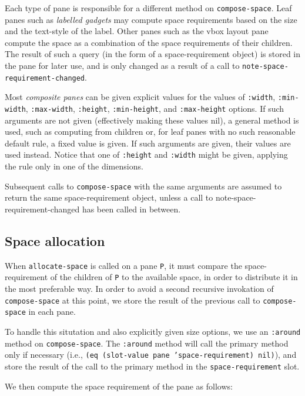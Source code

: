 Each type of pane is responsible for a different method on
\texttt{compose-space}.  Leaf panes such as \emph{labelled gadgets} may
compute space requirements based on the size and the text-style of the
label.  Other panes such as the vbox layout pane compute the space as a
combination of the space requirements of their children.  The result of
such a query (in the form of a space-requirement object) is stored in
the pane for later use, and is only changed as a result of a call to
\texttt{note-space-requirement-changed}.

Most \emph{composite panes} can be given explicit values for the values
of \texttt{:width}, \texttt{:min-width}, \texttt{:max-width},
\texttt{:height}, \texttt{:min-height}, and \texttt{:max-height}
options.  If such arguments are not given (effectively making these
values nil), a general method is used, such as computing from children
or, for leaf panes with no such reasonable default rule, a fixed value
is given.  If such arguments are given, their values are used instead.
Notice that one of \texttt{:height} and \texttt{:width} might be
given, applying the rule only in one of the dimensions.

Subsequent calls to \texttt{compose-space} with the same arguments are
assumed to return the same space-requirement object, unless a call to
note-space-requirement-changed has been called in between.

\subsection{Space allocation}
\label{space-allocation}

When \texttt{allocate-space} is called on a pane \texttt{P}, it must
compare the space-requirement of the children of \texttt{P} to the
available space, in order to distribute it in the most preferable way.
In order to avoid a second recursive invokation of
\texttt{compose-space} at this point, we store the result of the
previous call to \texttt{compose-space} in each pane.

To handle this situtation and also explicitly given size options, we use
an \texttt{:around} method on \texttt{compose-space}.  The
\texttt{:around} method will call the primary method only if necessary
(i.e., \texttt{(eq (slot-value pane 'space-requirement) nil)}), and store
the result of the call to the primary method in the
\texttt{space-requirement} slot.

We then compute the space requirement of the pane as follows:

